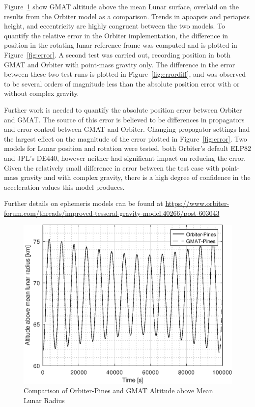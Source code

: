\documentclass[Orbiter Technical Reference.tex]{subfiles}
\begin{document}
Figure~\ref{fig:alt} show GMAT altitude above the mean Lunar surface, overlaid on the results from the Orbiter model as a comparison. Trends in apoapsis and periapsis height, and eccentricity are highly congruent between the two models. To quantify the relative error in the Orbiter implementation, the difference in position in the rotating lunar reference frame was computed and is plotted in Figure~\ref{fig:error}. A second test was carried out, recording position in both GMAT and Orbiter with point-mass gravity only. The difference in the error between these two test runs is plotted in Figure~\ref{fig:errordiff}, and was observed to be several orders of magnitude less than the absolute position error with or without complex gravity.

Further work is needed to quantify the absolute position error between Orbiter and GMAT. The source of this error is believed to be differences in propagators and error control between GMAT and Orbiter. Changing propagator settings had the largest effect on the magnitude of the error plotted in Figure~\ref{fig:error}. Two models for Lunar position and rotation were tested, both Orbiter's default ELP82 and JPL's DE440, however neither had significant impact on reducing the error. Given the relatively small difference in error between the test case with point-mass gravity and with complex gravity, there is a high degree of confidence in the acceleration values this model produces.

Further details on ephemeris models can be found at \url{https://www.orbiter-forum.com/threads/improved-tesseral-gravity-model.40266/post-603043}

\begin{figure}[H]
\centering
\includegraphics[width=1.0\textwidth]{altitude.eps}
\caption{Comparison of Orbiter-Pines and GMAT Altitude above Mean Lunar Radius}
\label{fig:alt}
\end{figure}
\end{document}
